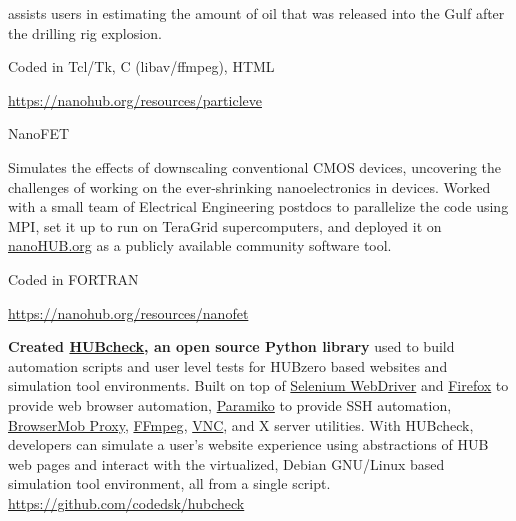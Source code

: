 \documentclass[10pt]{article}
\newcommand{\blankline}{\quad\pagebreak[3]}
\begin{document}
\begin{outerlist}
\begin{innerlist}
\begin{outerlist}
\begin{innerlist}
                              assists users in estimating the amount of oil
                              that was released into the Gulf after the
                              drilling rig explosion.
                            \item[] Coded in Tcl/Tk, C (libav/ffmpeg), HTML
                            \item[] \url{https://nanohub.org/resources/particleve} \hfill{}
                        \end{innerlist}
                    \item[] NanoFET
                        \begin{innerlist}
                            \item[] Simulates the effects
                              of downscaling conventional CMOS devices,
                              uncovering the challenges of working on the
                              ever-shrinking nanoelectronics in devices.
                              Worked with a small team of Electrical Engineering
                              postdocs to parallelize the code using MPI,
                              set it up to run on TeraGrid supercomputers,
                              and deployed it on
                              \href{https://nanohub.org}{nanoHUB.org}
                              as a publicly available community software
                              tool.
                            \item[] Coded in FORTRAN
                            \item[] \url{https://nanohub.org/resources/nanofet} \hfill{}
                        \end{innerlist}
                \end{outerlist}

            \blankline

            \item \textbf{Created \href{https://github.com/codedsk/hubcheck}{HUBcheck},
                an open source Python library} used to build automation scripts
                and user level tests for HUBzero based websites and simulation tool
                environments.  Built on top of
                \href{http://www.seleniumhq.org/projects/webdriver}{Selenium WebDriver}
                and \href{https://www.mozilla.org/en-US/firefox/new}{Firefox}
                to provide web browser automation,
                \href{http://www.paramiko.org}{Paramiko} to provide SSH automation,
                \href{https://bmp.lightbody.net}{BrowserMob Proxy},
                \href{https://www.ffmpeg.org}{FFmpeg},
                \href{http://www.karlrunge.com/x11vnc/}{VNC},
                and X server utilities. With HUBcheck, developers can
                simulate a user's website experience using abstractions of HUB
                web pages and interact with the virtualized, Debian GNU/Linux
                based simulation tool environment, all from a single script.\\
                \url{https://github.com/codedsk/hubcheck}


\end{innerlist}
\end{outerlist}
\end{document}
